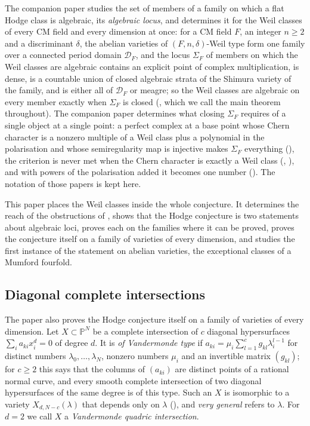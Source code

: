 \documentclass[11pt,reqno]{amsart}
\theoremstyle{plain}
\theoremstyle{definition}
\theoremstyle{remark}
\newcommand{\PP}{\mathbb{P}}
\newcommand{\cD}{\mathcal{D}}
\begin{document}
The companion paper \cite{paperI} studies the set of members of a family on
which a flat Hodge class is algebraic, its \emph{algebraic locus}, and
determines it for the Weil classes of every CM field and every dimension at
once: for a CM field $F$, an integer $n\ge2$ and a discriminant $\delta$, the
abelian varieties of $(F,n,\delta)$-Weil type form one family over a
connected period domain $\cD_{F}$, and the locus $\Sigma_{F}$ of members on
which the Weil classes are algebraic contains an explicit point of complex
multiplication, is dense, is a countable union of closed algebraic strata of
the Shimura variety of the family, and is either all of $\cD_{F}$ or meagre;
so the Weil classes are algebraic on every member exactly when $\Sigma_{F}$
is closed (\cite[Theorem~1.1]{paperI}, which we call the main theorem throughout). The
companion paper \cite{paperII} determines what closing $\Sigma_{F}$ requires
of a single object at a single point: a perfect complex at a base point
whose Chern character is a nonzero multiple of a Weil class plus a
polynomial in the polarisation and whose semiregularity map is injective
makes $\Sigma_{F}$ everything (\cite[Theorem~2.3]{paperII}), the criterion is
never met when the Chern character is exactly a Weil class
(\cite[Theorem~3.5]{paperII}, \cite[Theorem~5.4]{paperII}), and with powers of the
polarisation added it becomes one number (\cite[Theorem~3.9]{paperII}). The
notation of those papers is kept here.

This paper places the Weil classes inside the whole conjecture. It
determines the reach of the obstructions of \cite{paperI}, shows that the
Hodge conjecture is two statements about algebraic loci, proves each on the
families where it can be proved, proves the conjecture itself on a family of
varieties of every dimension, and studies the first instance of the
statement on abelian varieties, the exceptional classes of a Mumford
fourfold.

\subsection{Diagonal complete intersections}

The paper also proves the Hodge conjecture itself on a family of varieties
of every dimension. Let $X\subset\PP^{N}$ be a complete intersection of $c$
diagonal hypersurfaces $\sum_{i}a_{ki}x_{i}^{d}=0$ of degree $d$. It is
\emph{of Vandermonde type} if $a_{ki}=\mu_{i}\sum_{l=1}^{c}g_{kl}\lambda_{i}^{l-1}$
for distinct numbers $\lambda_{0},\dots,\lambda_{N}$, nonzero numbers
$\mu_{i}$ and an invertible matrix $(g_{kl})$; for $c\ge2$ this says that the
columns of $(a_{ki})$ are distinct points of a rational normal curve, and
every smooth complete intersection of two diagonal hypersurfaces of the same
degree is of this type. Such an $X$ is isomorphic to a variety
$X_{d,N-c}(\lambda)$ that depends only on $\lambda$ (),
and \emph{very general} refers to $\lambda$. For $d=2$ we call $X$ a
\emph{Vandermonde quadric intersection}.
\end{document}
